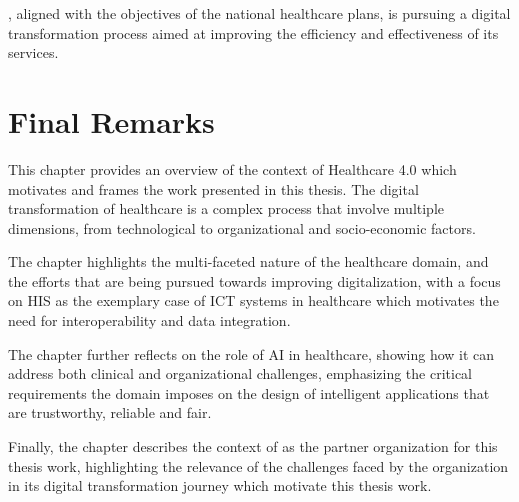 \ausl{}, aligned with the objectives of the national healthcare plans, is pursuing a digital transformation process aimed at improving the efficiency and effectiveness of its services.



\section{Final Remarks}

This chapter provides an overview of the context of Healthcare 4.0 which motivates and frames the work presented in this thesis. 
%
The digital transformation of healthcare is a complex process that involve multiple dimensions, from technological to organizational and socio-economic factors.

The chapter highlights the multi-faceted nature of the healthcare domain, and the efforts that are being pursued towards improving digitalization, with a focus on \ac{HIS} as the exemplary case of \ac{ICT} systems in healthcare which motivates the need for interoperability and data integration.

The chapter further reflects on the role of \ac{AI} in healthcare, showing how it can address both clinical and organizational challenges, emphasizing the critical requirements the domain imposes on the design of intelligent applications that are trustworthy, reliable and fair.

Finally, the chapter describes the context of \ausl{} as the partner organization for this thesis work, highlighting the relevance of the challenges faced by the organization in its digital transformation journey which motivate this thesis work. 